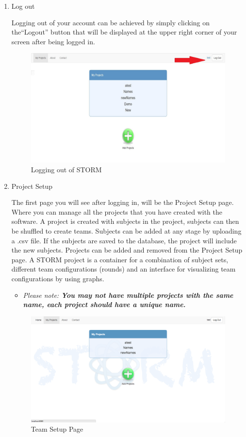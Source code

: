 \begin{enumerate}
\item Log out\par
Logging out of your account can be achieved by simply clicking on the``Logout'' button that will be displayed at the upper right corner of your screen after being logged in.
 \begin{figure}[H] 
	\centering
	\includegraphics[width=13cm]{./graphics/Logout.jpg}\par
	\caption{Logging out of STORM}
\end{figure}

\item Project Setup\par
The first page you will see after logging in, will be the Project Setup page.  Where you can manage all the projects that you have created with the software. A project is created with subjects in the project, subjects can then be shuffled to create teams. Subjects can be added at any stage by uploading a .csv file. If the subjects are saved to the database, the project will include the new subjects. Projects can be added and removed from the Project Setup page. A STORM project is a container for a combination of subject sets, different team configurations (rounds) and an interface for visualizing team configurations by using graphs.\par
\begin{itemize}
	\item[] \textit{Please note: \textbf{You may not have multiple projects with the same name, each project should have a unique name.}}
\end{itemize}
 \begin{figure}[H] 
	\centering
	\includegraphics[width=13cm]{./graphics/TeamSetup.jpg}\par
	\caption{Team Setup Page}
\end{figure}


\end{enumerate}
